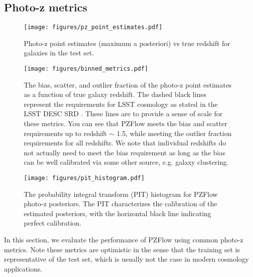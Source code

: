 \documentclass[twocolumn,twocolappendix,linenumbers]{aastex631}
\begin{document}
\subsection{Photo-z metrics}

\begin{figure}[t]
    \begin{centering}
        \texttt{[image: figures/pz\_point\_estimates.pdf]}
        \caption{
            Photo-z point estimates (maximum a posteriori) vs true redshift for galaxies in the test set.
        }
        \label{fig:point-estimates}
    \end{centering}
\end{figure}

\begin{figure*}[t]
    \begin{centering}
        \texttt{[image: figures/binned\_metrics.pdf]}
        \caption{
            The bias, scatter, and outlier fraction of the photo-z point estimates as a function of true galaxy redshift.
            The dashed black lines represent the requirements for LSST cosmology as stated in the LSST DESC SRD \citep{descSRD}.
            These lines are to provide a sense of scale for these metrics.
            You can see that PZFlow meets the bias and scatter requirements up to redshift $\sim$ 1.5, while meeting the outlier fraction requirements for all redshifts.
            We note that individual redshifts do not actually need to meet the bias requirement as long as the bias can be well calibrated via some other source, e.g. galaxy clustering.
        }
        \label{fig:binned-metrics}
    \end{centering}
\end{figure*}

\begin{figure}[t]
    \begin{centering}
        \texttt{[image: figures/pit\_histogram.pdf]}
        \caption{
            The probability integral transform (PIT) histogram for PZFlow photo-z posteriors.
            The PIT characterizes the calibration of the estimated posteriors, with the horizontal black line indicating perfect calibration.
        }
        \label{fig:pit-histogram}
    \end{centering}
\end{figure}

In this section, we evaluate the performance of PZFlow using common photo-z metrics.
Note these metrics are optimistic in the sense that the training set is representative of the test set, which is usually not the case in modern cosmology applications.
\end{document}
